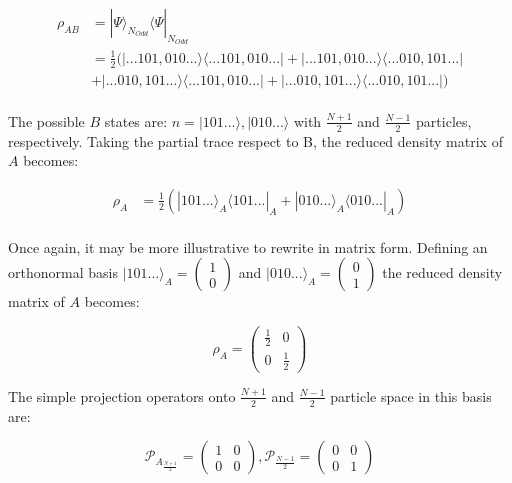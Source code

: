 \begin{samepage}
	\begin{equation}
	\begin{aligned}
\rho_{AB} &= | \Psi \rangle_{N_{Odd}} \langle \Psi |_{N_{Odd}} \\
&= \frac{1}{2} ( |...101,010... \rangle \langle ...101,010... | +  |...101,010... \rangle \langle ...010,101... |  \\
&+  |...010,101... \rangle \langle ...101,010... | + |...010,101... \rangle \langle ...010,101... | )\\
	\end{aligned}
	\end{equation}
	
The possible $B$ states are: $n = | 101... \rangle, | 010... \rangle$ with $\frac{N+1}{2}$ and $\frac{N-1}{2}$ particles, respectively. Taking the partial trace respect to B, the reduced density matrix of $A$ becomes:
	
	\begin{equation}
\begin{aligned}
\rho_{A} &= \frac{1}{2} ( | 101... \rangle_{A} \langle 101... |_{A} +  | 010... \rangle_{A} \langle 010... |_{A} )\\
\end{aligned}
\end{equation}

Once again, it may be more illustrative to rewrite in matrix form. Defining an orthonormal basis $| 101... \rangle_{A}  = \begin{pmatrix} 1 \\ 0\end{pmatrix}$ and $| 010... \rangle_{A}  = \begin{pmatrix} 0 \\ 1\end{pmatrix}$ the reduced density matrix of $A$ becomes:

\begin{equation}
\rho_{A} = 
\begin{pmatrix}
\frac{1}{2} & 0 \\
0 & \frac{1}{2}
\end{pmatrix}
\end{equation}

The simple projection operators onto $\frac{N+1}{2}$ and $\frac{N-1}{2}$ particle space in this basis are:

\begin{equation}
\mathcal{P}_{A_{\frac{N+1}{2}}} = \begin{pmatrix} 1 & 0 \\ 0 & 0 \end{pmatrix} , 
\mathcal{P}_{\frac{N-1}{2}} = \begin{pmatrix} 0 & 0 \\ 0 & 1 \end{pmatrix} 
\end{equation}


\end{samepage}
